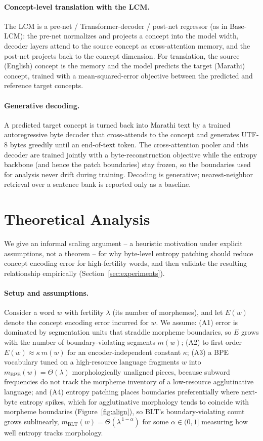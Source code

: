 \documentclass{article}
\begin{document}
\paragraph{Concept-level translation with the LCM.}
The LCM is a pre-net / Transformer-decoder / post-net regressor (as in Base-LCM): the pre-net normalizes and projects a concept into the model width, decoder layers attend to the source concept as cross-attention memory, and the post-net projects back to the concept dimension. For translation, the source (English) concept is the memory and the model predicts the target (Marathi) concept, trained with a mean-squared-error objective between the predicted and reference target concepts.

\paragraph{Generative decoding.}
A predicted target concept is turned back into Marathi text by a trained autoregressive byte decoder that cross-attends to the concept and generates UTF-8 bytes greedily until an end-of-text token. The cross-attention pooler and this decoder are trained jointly with a byte-reconstruction objective while the entropy backbone (and hence the patch boundaries) stay frozen, so the boundaries used for analysis never drift during training. Decoding is generative; nearest-neighbor retrieval over a sentence bank is reported only as a baseline.

\section{Theoretical Analysis}
\label{sec:theory}

We give an informal scaling argument -- a heuristic motivation under explicit assumptions, not a theorem -- for why byte-level entropy patching should reduce concept encoding error for high-fertility words, and then validate the resulting relationship empirically (Section~\ref{sec:experiments}).

\paragraph{Setup and assumptions.}
Consider a word $w$ with fertility $\lambda$ (its number of morphemes), and let $E(w)$ denote the concept encoding error incurred for $w$. We assume: (A1) error is dominated by segmentation units that straddle morpheme boundaries, so $E$ grows with the number of boundary-violating segments $m(w)$; (A2) to first order $E(w) \approx \kappa\, m(w)$ for an encoder-independent constant $\kappa$; (A3) a BPE vocabulary tuned on a high-resource language fragments $w$ into $m_{\mathrm{BPE}}(w) = \Theta(\lambda)$ morphologically unaligned pieces, because subword frequencies do not track the morpheme inventory of a low-resource agglutinative language; and (A4) entropy patching places boundaries preferentially where next-byte entropy spikes, which for agglutinative morphology tends to coincide with morpheme boundaries (Figure~\ref{fig:align}), so BLT's boundary-violating count grows sublinearly, $m_{\mathrm{BLT}}(w) = \Theta(\lambda^{\,1-\alpha})$ for some $\alpha \in (0,1]$ measuring how well entropy tracks morphology.
\end{document}
